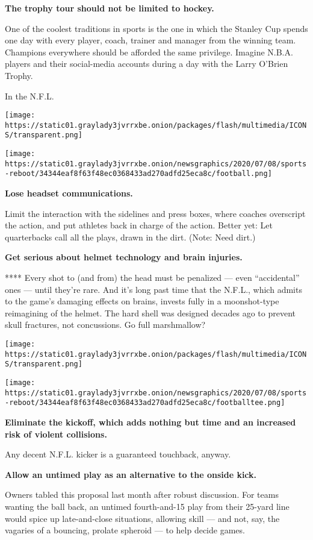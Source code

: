 \textbf{The trophy tour should not be limited to hockey.}

One of the coolest traditions in sports is the one in which the Stanley
Cup spends one day with every player, coach, trainer and manager from
the winning team. Champions everywhere should be afforded the same
privilege. Imagine N.B.A. players and their social-media accounts during
a day with the Larry O'Brien Trophy.

In the N.F.L.

\texttt{[image: https://static01.graylady3jvrrxbe.onion/packages/flash/multimedia/ICONS/transparent.png]}

\texttt{[image: https://static01.graylady3jvrrxbe.onion/newsgraphics/2020/07/08/sports-reboot/34344eaf8f63f48ec0368433ad270adfd25eca8c/football.png]}

\textbf{Lose headset communications.}

Limit the interaction with the sidelines and press boxes, where coaches
overscript the action, and put athletes back in charge of the action.
Better yet: Let quarterbacks call all the plays, drawn in the dirt.
(Note: Need dirt.)

\textbf{Get serious about helmet technology and brain injuries.}

**** Every shot to (and from) the head must be penalized --- even
``accidental'' ones --- until they're rare. And it's long past time that
the N.F.L., which admits to the game's damaging effects on brains,
invests fully in a moonshot-type reimagining of the helmet. The hard
shell was designed decades ago to prevent skull fractures, not
concussions. Go full marshmallow?

\texttt{[image: https://static01.graylady3jvrrxbe.onion/packages/flash/multimedia/ICONS/transparent.png]}

\texttt{[image: https://static01.graylady3jvrrxbe.onion/newsgraphics/2020/07/08/sports-reboot/34344eaf8f63f48ec0368433ad270adfd25eca8c/footballtee.png]}

\textbf{Eliminate the kickoff, which adds nothing but time and an
increased risk of violent collisions.}

Any decent N.F.L. kicker is a guaranteed touchback, anyway.

\textbf{Allow an untimed play as an alternative to the onside kick.}

Owners tabled this proposal last month after robust discussion. For
teams wanting the ball back, an untimed fourth-and-15 play from their
25-yard line would spice up late-and-close situations, allowing skill
--- and not, say, the vagaries of a bouncing, prolate spheroid --- to
help decide games.

